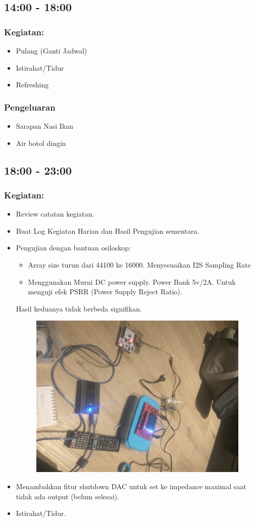 \documentclass[12pt,]{article}
\begin{document}
	\newpage
	\subsection{14:00 - 18:00}
	\subsubsection{Kegiatan:}
	\begin{itemize}
		\item Pulang (Ganti Jadwal)
		\item Istirahat/Tidur
		\item Refreshing
	\end{itemize}
	\subsubsection{Pengeluaran}
	\begin{itemize}
		\item Sarapan Nasi Ikan
		\item Air botol dingin
	\end{itemize}

	\subsection{18:00 - 23:00}
	\subsubsection{Kegiatan:}
	\begin{itemize}
		\item Review catatan kegiatan.
		\item Buat Log Kegiatan Harian dan Hasil Pengujian sementara.
		\item Pengujian dengan bantuan osiloskop:
		\begin{itemize}
			\item Array size turun dari 44100 ke 16000.
			Menyesuaikan I2S Sampling Rate
			\item Menggunakan Murni DC power supply.
			Power Bank 5v/2A.
			Untuk menguji efek PSRR (Power Supply Reject Ratio).
		\end{itemize}
		Hasil keduanya tidak berbeda signifikan.
		\begin{figure}[H]
			\centering
			\includegraphics[width=0.5\linewidth]{result/day_2/nighttest}
		\end{figure}
		\item Menambahkan fitur shutdown DAC untuk set ke impedance maximal saat tidak ada output (belum selesai).
		\item Istirahat/Tidur.
	\end{itemize}
\end{document}
